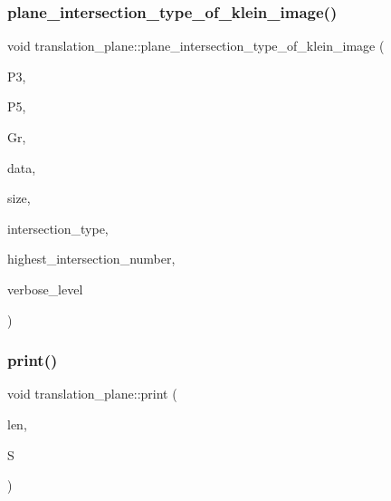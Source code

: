 \mbox{\label{classtranslation__plane_a94a299194cf1a663e9ffcb5fc7201a65}} 
\subsubsection{\texorpdfstring{plane\+\_\+intersection\+\_\+type\+\_\+of\+\_\+klein\+\_\+image()}{plane\_intersection\_type\_of\_klein\_image()}}
{\footnotesize\ttfamily void translation\+\_\+plane\+::plane\+\_\+intersection\+\_\+type\+\_\+of\+\_\+klein\+\_\+image (\begin{DoxyParamCaption}\item[{\mbox{\hyperlink{classprojective__space}{projective\+\_\+space}} $\ast$}]{P3,  }\item[{\mbox{\hyperlink{classprojective__space}{projective\+\_\+space}} $\ast$}]{P5,  }\item[{\mbox{\hyperlink{classgrassmann}{grassmann}} $\ast$}]{Gr,  }\item[{\mbox{\hyperlink{galois_8h_a09fddde158a3a20bd2dcadb609de11dc}{I\+NT}} $\ast$}]{data,  }\item[{\mbox{\hyperlink{galois_8h_a09fddde158a3a20bd2dcadb609de11dc}{I\+NT}}}]{size,  }\item[{\mbox{\hyperlink{galois_8h_a09fddde158a3a20bd2dcadb609de11dc}{I\+NT}} $\ast$\&}]{intersection\+\_\+type,  }\item[{\mbox{\hyperlink{galois_8h_a09fddde158a3a20bd2dcadb609de11dc}{I\+NT}} \&}]{highest\+\_\+intersection\+\_\+number,  }\item[{\mbox{\hyperlink{galois_8h_a09fddde158a3a20bd2dcadb609de11dc}{I\+NT}}}]{verbose\+\_\+level }\end{DoxyParamCaption})}

\mbox{\label{classtranslation__plane_a1a9eda29d7d0beaad4ae86f2c0e06255}} 
\subsubsection{\texorpdfstring{print()}{print()}}
{\footnotesize\ttfamily void translation\+\_\+plane\+::print (\begin{DoxyParamCaption}\item[{\mbox{\hyperlink{galois_8h_a09fddde158a3a20bd2dcadb609de11dc}{I\+NT}}}]{len,  }\item[{\mbox{\hyperlink{galois_8h_a09fddde158a3a20bd2dcadb609de11dc}{I\+NT}} $\ast$}]{S }\end{DoxyParamCaption})}

